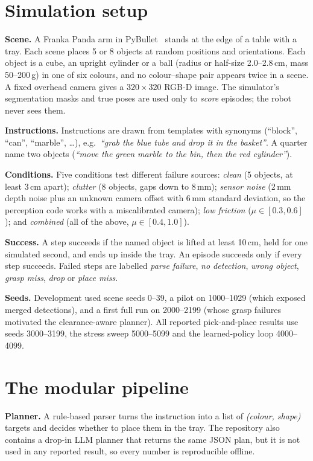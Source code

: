 \documentclass[10pt,a4paper]{article}
\begin{document}
\section{Simulation setup}
\textbf{Scene.} A Franka Panda arm in PyBullet~\cite{pybullet} stands at the edge
of a table with a tray. Each scene places 5 or 8 objects at random positions and
orientations. Each object is a cube, an upright cylinder or a ball (radius or
half-size 2.0--2.8\,cm, mass 50--200\,g) in one of six colours, and no
colour--shape pair appears twice in a scene. A fixed overhead camera gives a
$320{\times}320$ RGB-D image. The simulator's segmentation masks and true
poses are used only to \emph{score} episodes; the robot never sees them.

\textbf{Instructions.} Instructions are drawn from templates with synonyms
(``block'', ``can'', ``marble'', \ldots), e.g.\ \emph{``grab the blue tube and
drop it in the basket''}. A quarter name two objects (\emph{``move the green
marble to the bin, then the red cylinder''}).

\textbf{Conditions.} Five conditions test different failure sources:
\emph{clean} (5 objects, at least 3\,cm apart); \emph{clutter} (8 objects,
gaps down to 8\,mm); \emph{sensor noise} (2\,mm depth noise plus an unknown
camera offset with 6\,mm standard deviation, so the perception code works with
a miscalibrated camera); \emph{low friction} ($\mu\in[0.3,0.6]$); and
\emph{combined} (all of the above, $\mu\in[0.4,1.0]$).

\textbf{Success.} A step succeeds if the named object is lifted at least 10\,cm,
held for one simulated second, and ends up inside the tray. An episode succeeds
only if every step succeeds. Failed steps are labelled \emph{parse failure},
\emph{no detection}, \emph{wrong object}, \emph{grasp miss}, \emph{drop} or
\emph{place miss}.

\textbf{Seeds.} Development used scene seeds 0--39, a pilot on 1000--1029
(which exposed merged detections), and a first full run on 2000--2199 (whose
grasp failures motivated the clearance-aware planner). All reported pick-and-place results use seeds 3000--3199, the stress
sweep 5000--5099 and the learned-policy loop 4000--4099.

\section{The modular pipeline}
\textbf{Planner.} A rule-based parser turns the instruction into a list of
\emph{(colour, shape)} targets and decides whether to place them in the tray.
The repository also contains a drop-in LLM planner that returns the same JSON
plan, but it is not used in any reported result, so every number is
reproducible offline.
\end{document}

